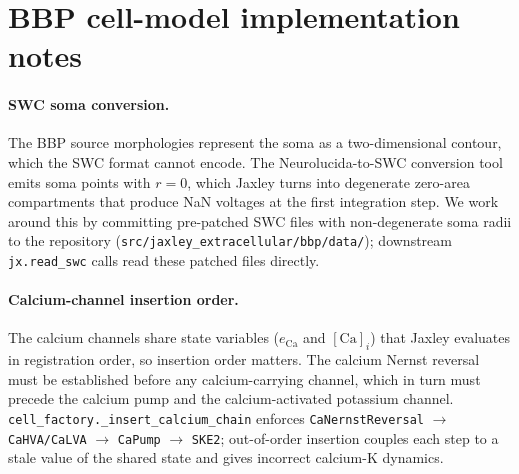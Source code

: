 \section{BBP cell-model implementation notes}\label{app:bbp-implementation}

\paragraph{SWC soma conversion.} The BBP source morphologies represent
the soma as a two-dimensional contour, which the SWC format cannot
encode. The Neurolucida-to-SWC conversion tool emits soma points with
$r = 0$, which Jaxley turns into degenerate zero-area compartments
that produce NaN voltages at the first integration step. We work
around this by committing pre-patched SWC files with non-degenerate
soma radii to the repository
(\texttt{src/jaxley\_extracellular/bbp/data/}); downstream
\texttt{jx.read\_swc} calls read these patched files directly.

\paragraph{Calcium-channel insertion order.} The calcium channels
share state variables ($e_\mathrm{Ca}$ and $[\mathrm{Ca}]_i$) that
Jaxley evaluates in registration order, so insertion order matters.
The calcium Nernst reversal must be established before any
calcium-carrying channel, which in turn must precede the calcium pump
and the calcium-activated potassium channel.
\texttt{cell\_factory.\_insert\_calcium\_chain} enforces
\texttt{CaNernstReversal} $\to$ \texttt{CaHVA/CaLVA} $\to$
\texttt{CaPump} $\to$ \texttt{SKE2}; out-of-order insertion couples
each step to a stale value of the shared state and gives incorrect
calcium-K dynamics.


